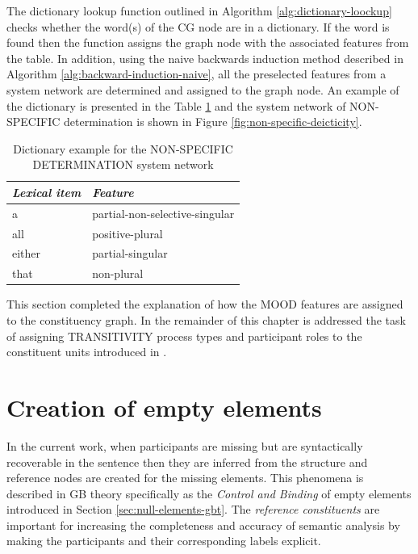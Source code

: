     The dictionary lookup function outlined in Algorithm \ref{alg:dictionary-loockup} checks whether the word(s) of the CG node are in a dictionary. If the word is found then the function assigns the graph node with the associated features from the table. In addition, using the naive backwards induction method described in Algorithm \ref{alg:backward-induction-naive}, all the preselected features from a system network are determined and assigned to the graph node. %
    An example of the dictionary is presented in the Table \ref{tab:lookup-dict-example} and the system network of NON-SPECIFIC determination is shown in Figure \ref{fig:non-specific-deicticity}.

\begin{table}[!ht]
    \centering
    \begin{tabular}{|l|l|}
        \hline
        \textit{Lexical item} & \textit{Feature}               \\ \hline
        a                     & partial-non-selective-singular \\ \hline
        all                   & positive-plural                \\ \hline
        either                & partial-singular               \\ \hline
        that                  & non-plural                     \\ \hline
    \end{tabular}
    \caption{Dictionary example for the NON-SPECIFIC DETERMINATION system network}
    \label{tab:lookup-dict-example}
\end{table}

    This section completed the explanation of how the MOOD features are assigned to the constituency graph. In the remainder of this chapter is addressed the task of assigning TRANSITIVITY process types and participant roles to the constituent units introduced in \citet{Costetchi2013}.

\section{Creation of empty elements}
\label{sec:creation-empty-elements}

    In the current work, when participants are missing but are syntactically recoverable in the sentence then they are inferred from the structure and reference nodes are created for the missing elements. This phenomena is described in GB theory specifically as the \textit{Control and Binding} of empty elements \citep{Haegeman1991} introduced in Section \ref{sec:null-elements-gbt}. The \textit{reference constituents} are important for increasing the completeness and accuracy of semantic analysis by making the participants and their corresponding labels explicit.

